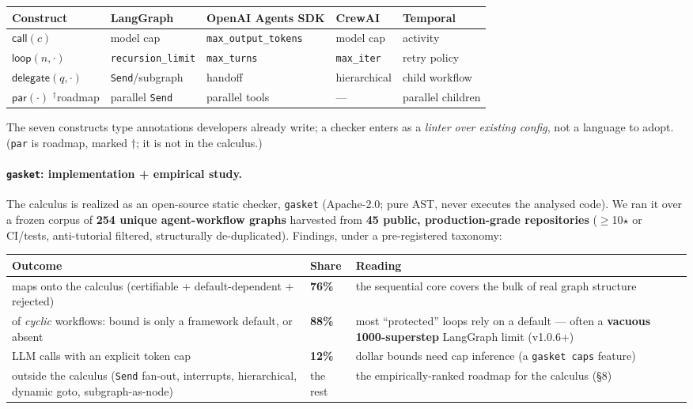 \documentclass[11pt]{article}
\theoremstyle{plain}
\newcommand{\kw}[1]{\mathsf{#1}}                      %
\begin{document}
\begin{center}\small
\begin{tabular}{@{}lllll@{}}
\toprule
Construct & LangGraph & OpenAI Agents SDK & CrewAI & Temporal \\
\midrule
$\kw{call}(c)$ & model cap & \texttt{max\_output\_tokens} & model cap & activity \\
$\kw{loop}(n, \cdot)$ & \texttt{recursion\_limit} & \texttt{max\_turns} & \texttt{max\_iter} & retry policy \\
$\kw{delegate}(q, \cdot)$ & \texttt{Send}/subgraph & handoff & hierarchical & child workflow \\
$\kw{par}(\cdot)$ $^{\dagger}$roadmap & parallel \texttt{Send} & parallel tools & --- & parallel children \\
\bottomrule
\end{tabular}
\end{center}

The seven constructs type annotations developers already write; a checker enters as a \emph{linter
over existing config}, not a language to adopt. (\texttt{par} is roadmap, marked $\dagger$; it is
not in the calculus.)

\paragraph{\texttt{gasket}: implementation + empirical study.}
The calculus is realized as an open-source static checker, \texttt{gasket} (Apache-2.0; pure AST,
never executes the analysed code). We ran it over a frozen corpus of \textbf{254 unique
agent-workflow graphs} harvested from \textbf{45 public, production-grade repositories} ($\ge$10$\star$
or CI/tests, anti-tutorial filtered, structurally de-duplicated). Findings, under a pre-registered
taxonomy:

\begin{center}\footnotesize
\begin{tabular}{@{}R{6.4cm}R{1.4cm}R{6.1cm}@{}}
\toprule
Outcome & Share & Reading \\
\midrule
maps onto the calculus (certifiable + default-dependent + rejected) & \textbf{76\%} &
  the sequential core covers the bulk of real graph structure \\
of \emph{cyclic} workflows: bound is only a framework default, or absent & \textbf{88\%} &
  most ``protected'' loops rely on a default --- often a \textbf{vacuous 1000-superstep} LangGraph
  limit (v1.0.6+) \\
LLM calls with an explicit token cap & \textbf{12\%} &
  dollar bounds need cap inference (a \texttt{gasket caps} feature) \\
outside the calculus (\texttt{Send} fan-out, interrupts, hierarchical, dynamic goto,
  subgraph-as-node) & the rest & the empirically-ranked roadmap for the calculus (\S8) \\
\bottomrule
\end{tabular}
\end{center}
\end{document}
